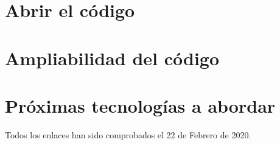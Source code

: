 \documentclass[
  a4paper,  %
  twoside,  %
  bibliography=totoc,
  headsepline,
  cleardoublepage=empty,
  parskip=half,
  draft=false
]{scrbook}
\begin{document}
\section{Abrir el código}


\section{Ampliabilidad del código}


\section{Próximas tecnologías a abordar}


\printbibliography

Todos los enlaces han sido comprobados el 22 de Febrero de 2020.

% 

\pagestyle{empty}
\renewcommand*{\chapterpagestyle}{empty}
\end{document}
